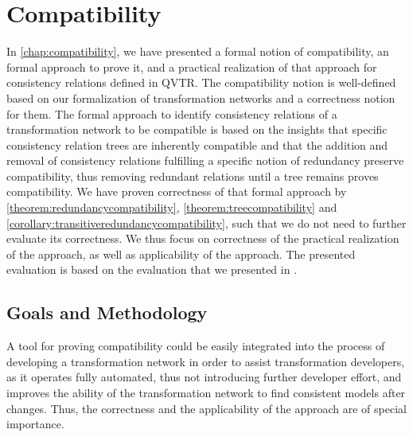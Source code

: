 \section{Compatibility}
\label{chap:correctness_evaluation:compatibility}

In \autoref{chap:compatibility}, we have presented a formal notion of compatibility, an formal approach to prove it, and a practical realization of that approach for consistency relations defined in \gls{QVTR}.
The compatibility notion is well-defined based on our formalization of transformation networks and a correctness notion for them.
The formal approach to identify consistency relations of a transformation network to be compatible is based on the insights that specific consistency relation trees are inherently compatible and that the addition and removal of consistency relations fulfilling a specific notion of redundancy preserve compatibility, thus removing redundant relations until a tree remains proves compatibility.
We have proven correctness of that formal approach by \autoref{theorem:redundancycompatibility}, \autoref{theorem:treecompatibility} and \autoref{corollary:transitiveredundancycompatibility}, such that we do not need to further evaluate its correctness.
We thus focus on correctness of the practical realization of the approach, as well as applicability of the approach.
The presented evaluation is based on the evaluation that we presented in .


\subsection{Goals and Methodology}

A tool for proving compatibility could be easily integrated into the process of developing a transformation network in order to assist transformation developers, as it operates fully automated, thus not introducing further developer effort, and improves the ability of the transformation network to find consistent models after changes.
Thus, the correctness and the applicability of the approach are of special importance.

